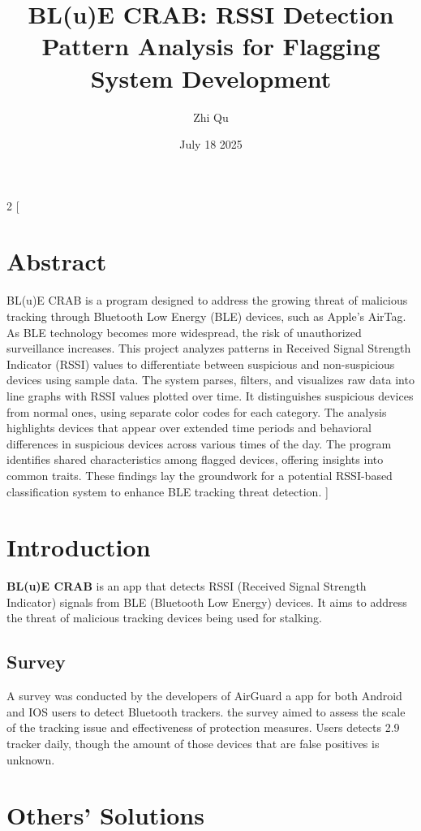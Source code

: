 \documentclass{article}
\title{BL(u)E CRAB: RSSI Detection Pattern Analysis for Flagging System Development}
\author{Zhi Qu}
\date{July 18 2025}
\begin{document}
\begin{multicols}{2}
[
\maketitle
\section{Abstract}
BL(u)E CRAB is a program designed to address the growing threat of malicious tracking through Bluetooth Low Energy (BLE) devices, such as Apple’s AirTag. As BLE technology becomes more widespread, the risk of unauthorized surveillance increases. This project analyzes patterns in Received Signal Strength Indicator (RSSI) values to differentiate between suspicious and non-suspicious devices using sample data. The system parses, filters, and visualizes raw data into line graphs with RSSI values plotted over time. It distinguishes suspicious devices from normal ones, using separate color codes for each category. The analysis highlights devices that appear over extended time periods and behavioral differences in suspicious devices across various times of the day. The program identifies shared characteristics among flagged devices, offering insights into common traits. These findings lay the groundwork for a potential RSSI-based classification system to enhance BLE tracking threat detection.
]
\section{Introduction}
\textbf{BL(u)E CRAB}
is an app that detects RSSI (Received Signal Strength Indicator) signals from BLE (Bluetooth Low Energy) devices. It aims to address the threat of malicious tracking devices being used for stalking. \cite{conklin2025bl}



\subsection{Survey}
A survey was conducted by the developers of AirGuard a app for both Android and IOS users to detect Bluetooth trackers. the survey aimed to assess the scale of the tracking issue and effectiveness of protection measures. Users detects 2.9 tracker daily, though the amount of those devices that are false positives is unknown. \cite{turk2023stop}


\section{Others' Solutions}


\end{multicols}
\end{document}
